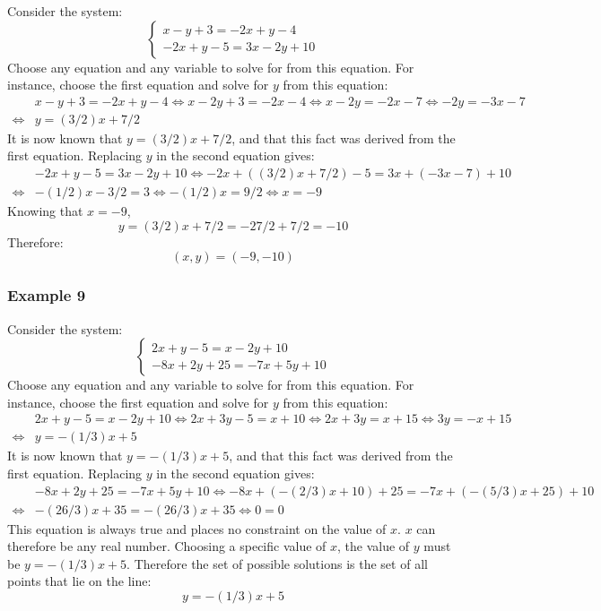 \documentclass{article}
\begin{document}
Consider the system:
\[\left\{\begin{array}{c} 
x - y + 3 = -2x + y - 4 \\
-2x + y - 5 = 3x - 2y + 10
\end{array}\right.\] 
Choose any equation and any variable to solve for from this equation. For instance, choose the first equation and solve for \(y\) from this equation: 
\begin{align*}
& x - y + 3 = -2x + y - 4 
\iff x - 2y + 3 = -2x - 4 
\iff x - 2y = -2x - 7
\iff -2y = -3x - 7 \\
\iff & y = (3/2)x + 7/2
\end{align*}
It is now known that \(y = (3/2)x + 7/2\), and that this fact was derived from the first equation. Replacing \(y\) in the second equation gives:
\begin{align*}
& -2x + y - 5 = 3x - 2y + 10 
\iff -2x + ((3/2)x + 7/2) - 5 = 3x + (-3x - 7) + 10 \\
\iff & -(1/2)x - 3/2 = 3
\iff -(1/2)x = 9/2 
\iff x = -9
\end{align*}
Knowing that \(x = -9\),
\[y = (3/2)x + 7/2 = -27/2 + 7/2 = -10\]
Therefore:
\[(x, y) = (-9, -10)\]


\subsubsection*{Example 9}

Consider the system:
\[\left\{\begin{array}{c} 
2x + y - 5 = x - 2y + 10 \\
-8x + 2y + 25 = -7x + 5y + 10
\end{array}\right.\] 
Choose any equation and any variable to solve for from this equation. For instance, choose the first equation and solve for \(y\) from this equation: 
\begin{align*}
& 2x + y - 5 = x - 2y + 10 
\iff 2x + 3y - 5 = x + 10 
\iff 2x + 3y = x + 15 
\iff 3y = -x + 15 \\
\iff & y = -(1/3)x + 5
\end{align*}
It is now known that \(y = -(1/3)x + 5\), and that this fact was derived from the first equation. Replacing \(y\) in the second equation gives: 
\begin{align*}
& -8x + 2y + 25 = -7x + 5y + 10 
\iff -8x + (-(2/3)x + 10) + 25 = -7x +(-(5/3)x + 25) + 10 \\
\iff & -(26/3)x + 35 = -(26/3)x + 35 
\iff 0 = 0
\end{align*}
This equation is always true and places no constraint on the value of \(x\). \(x\) can therefore be any real number. Choosing a specific value of \(x\), the value of \(y\) must be \(y = -(1/3)x + 5\). Therefore the set of possible solutions is the set of all points that lie on the line:
\[y = -(1/3)x + 5\] 
\end{document}
